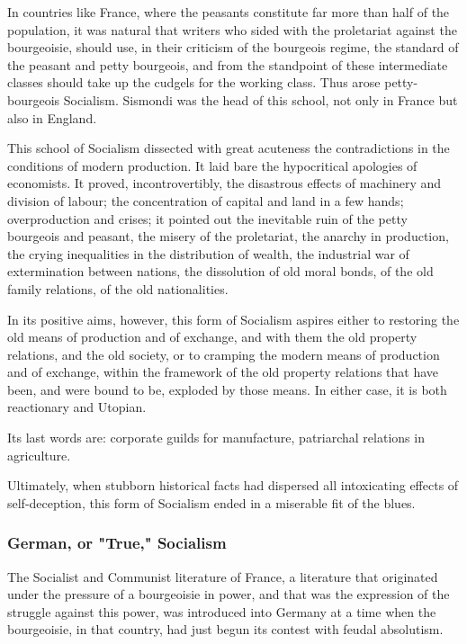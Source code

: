 \documentclass[, oneside]{article}   	%
\begin{document}
In countries like France, where the peasants constitute far more than half of the population, it was natural that writers who sided with the proletariat against the bourgeoisie, should use, in their criticism of the bourgeois regime, the standard of the peasant and petty bourgeois, and from the standpoint of these intermediate classes should take up the cudgels for the working class. Thus arose petty-bourgeois Socialism. Sismondi was the head of this school, not only in France but also in England.

This school of Socialism dissected with great acuteness the contradictions in the conditions of modern production. It laid bare the hypocritical apologies of economists. It proved, incontrovertibly, the disastrous effects of machinery and division of labour; the concentration of capital and land in a few hands; overproduction and crises; it pointed out the inevitable ruin of the petty bourgeois and peasant, the misery of the proletariat, the anarchy in production, the crying inequalities in the distribution of wealth, the industrial war of extermination between nations, the dissolution of old moral bonds, of the old family relations, of the old nationalities.

In its positive aims, however, this form of Socialism aspires either to restoring the old means of production and of exchange, and with them the old property relations, and the old society, or to cramping the modern means of production and of exchange, within the framework of the old property relations that have been, and were bound to be, exploded by those means. In either case, it is both reactionary and Utopian.

Its last words are: corporate guilds for manufacture, patriarchal relations in agriculture.

Ultimately, when stubborn historical facts had dispersed all intoxicating effects of self-deception, this form of Socialism ended in a miserable fit of the blues.

\subsubsection{German, or "True," Socialism}
The Socialist and Communist literature of France, a literature that originated under the pressure of a bourgeoisie in power, and that was the expression of the struggle against this power, was introduced into Germany at a time when the bourgeoisie, in that country, had just begun its contest with feudal absolutism.
\end{document}
